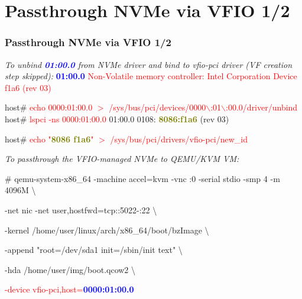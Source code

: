 \documentclass[aspectratio=169]{beamer}
\begin{document}
\section{Passthrough NVMe via VFIO 1/2}
\begin{frame}
\frametitle{Passthrough NVMe via VFIO 1/2}
\begin{block}{}
\textit{To unbind \textbf{\textcolor{blue}{01:00.0}} from NVMe driver and bind to vfio-pci driver (VF creation step skipped):} \newline
{\small \textcolor{red}{\textbf{\textcolor{blue}{01:00.0}} Non-Volatile memory controller: Intel Corporation Device f1a6 (rev 03)}}

\vspace{2 mm}

host\# \textcolor{red}{echo 0000:01:00.0 $>$ /sys/bus/pci/devices/0000$\backslash$:01$\backslash$:00.0/driver/unbind} \newline
host\# \textcolor{red}{lspci -ns 0000:01:00.0} \newline
{\small 01:00.0 0108: \textbf{\textcolor{olive}{8086:f1a6}} (rev 03)}

\vspace{1 mm}

host\# \textcolor{red}{echo "\textbf{\textcolor{olive}{8086 f1a6}}" $>$ /sys/bus/pci/drivers/vfio-pci/new\_id}
\end{block}
\begin{block}{}
\textit{To passthrough the VFIO-managed NVMe to QEMU/KVM VM:}

\vspace{2 mm}

{\small
\# qemu-system-x86\_64 -machine accel=kvm -vnc :0 -serial stdio -smp 4 -m 4096M \textbackslash

-net nic -net user,hostfwd=tcp::5022-:22 \textbackslash

-kernel /home/user/linux/arch/x86\_64/boot/bzImage \textbackslash
	
-append "root=/dev/sda1 init=/sbin/init text" \textbackslash

-hda /home/user/img/boot.qcow2 \textbackslash
}

\textcolor{red}{-device vfio-pci,host=\textbf{\textcolor{blue}{0000:01:00.0}}}
\end{block}
\end{frame}

\end{document}
